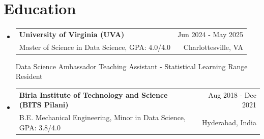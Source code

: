\documentclass[letterpaper,11pt]{article}
\makeatletter
\newcommand{\resumeSubheading}[4]{
  \item
    \begin{tabular*}{1\textwidth}{l@{\extracolsep{\fill}}r}
      \textbf{\large{#1}} & {\small{#4}} \\
      {{\small{#3}}} & {{\small{#2}}}
    \end{tabular*}
  \vspace{-0.4cm}
}
\newcommand{\resumeSubHeadingListStart}{\begin{itemize}[leftmargin=0.0in, label={}]}
\newcommand{\resumeSubHeadingListEnd}{\end{itemize}}
\makeatother
\begin{document}
\section{Education}
\resumeSubHeadingListStart
\resumeSubheading
    {University of Virginia {(UVA)}}
    {Charlottesville, VA}
    {Master of Science in Data Science, GPA: 4.0/4.0}
    {Jun 2024 - May 2025}

    \vspace{3pt}
    \footnotesize{
    Data Science Ambassador {\textbullet}
    Teaching Assistant - Statistical Learning {\textbullet}
    Range Resident
    }

    \vspace{5pt}
    


\resumeSubheading
    {Birla Institute of Technology and Science \normalsize{(BITS Pilani)}}
    {Hyderabad, India}
    {B.E. Mechanical Engineering, Minor in Data Science, GPA: 3.8/4.0}
    {Aug 2018 - Dec 2021}
\resumeSubHeadingListEnd






\end{document}
